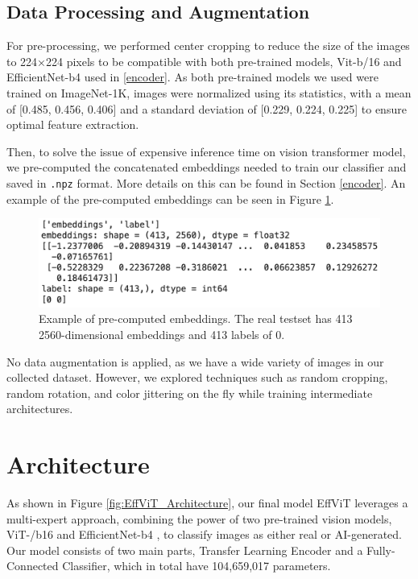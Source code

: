 \documentclass{article} %
\begin{document}
\subsection{Data Processing and Augmentation}
\label{data_processing}
For pre-processing, we performed center cropping to reduce the size of the images to 224×224 pixels to be compatible with both pre-trained models, Vit-b/16 \citep{dosovitskiy2020image} and EfficientNet-b4 \citep{tan2019efficientnet} used in \ref{encoder}. As both pre-trained models we used were trained on ImageNet-1K, images were normalized using its statistics, with a mean of [0.485, 0.456, 0.406] and a standard deviation of [0.229, 0.224, 0.225] to ensure optimal feature extraction.

Then, to solve the issue of expensive inference time on vision transformer model, we pre-computed the concatenated embeddings needed to train our classifier and saved in \texttt{.npz} format. More details on this can be found in Section \ref{encoder}. An example of the pre-computed embeddings can be seen in Figure \ref{fig:pre-computation}.

\begin{figure}[h]
    \begin{center}
        \includegraphics[scale=0.27]{figs/pre-computation.png}
    \end{center}
    \caption{Example of pre-computed embeddings. The real testset has 413 2560-dimensional embeddings and 413 labels of 0.} 
    \label{fig:pre-computation}
\end{figure}

No data augmentation is applied, as we have a wide variety of images in our collected dataset. However, we explored techniques such as random cropping, random rotation, and color jittering on the fly while training intermediate architectures.

\section{Architecture}
\label{arch}

As shown in Figure \ref{fig:EffViT_Architecture}, our final model EffViT leverages a multi-expert approach, combining the power of two pre-trained vision models, ViT-/b16 \citep{dosovitskiy2020image} and EfficientNet-b4 \citep{brock2019largescalegantraining}, to classify images as either real or AI-generated. Our model consists of two main parts, Transfer Learning Encoder and a Fully-Connected Classifier, which in total have 104,659,017 parameters. 
\end{document}
